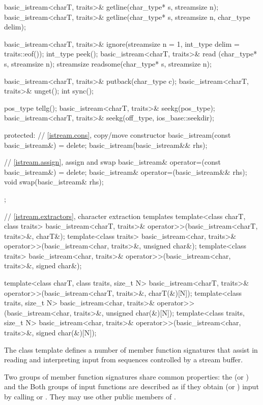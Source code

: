 \begin{codeblock}
{{    basic_istream<charT, traits>& getline(char_type* s, streamsize n);
    basic_istream<charT, traits>& getline(char_type* s, streamsize n, char_type delim);

    basic_istream<charT, traits>& ignore(streamsize n = 1, int_type delim = traits::eof());
    int_type                      peek();
    basic_istream<charT, traits>& read    (char_type* s, streamsize n);
    streamsize                    readsome(char_type* s, streamsize n);

    basic_istream<charT, traits>& putback(char_type c);
    basic_istream<charT, traits>& unget();
    int sync();

    pos_type tellg();
    basic_istream<charT, traits>& seekg(pos_type);
    basic_istream<charT, traits>& seekg(off_type, ios_base::seekdir);

  protected:
    // \ref{istream.cons}, copy/move constructor
    basic_istream(const basic_istream&) = delete;
    basic_istream(basic_istream&& rhs);

    // \ref{istream.assign}, assign and swap
    basic_istream& operator=(const basic_istream&) = delete;
    basic_istream& operator=(basic_istream&& rhs);
    void swap(basic_istream& rhs);
  };

  // \ref{istream.extractors}, character extraction templates
  template<class charT, class traits>
    basic_istream<charT, traits>& operator>>(basic_istream<charT, traits>&, charT&);
  template<class traits>
    basic_istream<char, traits>& operator>>(basic_istream<char, traits>&, unsigned char&);
  template<class traits>
    basic_istream<char, traits>& operator>>(basic_istream<char, traits>&, signed char&);

  template<class charT, class traits, size_t N>
    basic_istream<charT, traits>& operator>>(basic_istream<charT, traits>&, charT(&)[N]);
  template<class traits, size_t N>
    basic_istream<char, traits>& operator>>(basic_istream<char, traits>&, unsigned char(&)[N]);
  template<class traits, size_t N>
    basic_istream<char, traits>& operator>>(basic_istream<char, traits>&, signed char(&)[N]);
}
\end{codeblock}

\pnum
The class template
defines a number of member function
signatures that assist in reading and interpreting input from sequences
controlled by a stream buffer.

\pnum
Two groups of member function signatures share common properties:
the
(or
)
and the
Both groups of input functions are described as if they obtain (or
)
input
by calling
or
.
They may use other public members of
.


